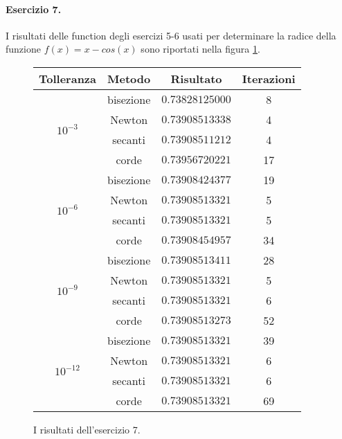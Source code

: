 \paragraph{Esercizio 7.} I risultati delle function degli esercizi 5-6 usati per determinare la radice della funzione $f(x) = x - cos(x)$ sono riportati nella figura \ref{fig:esercizio7}.

\begin{figure}
  \centering
  \begin{tabular}{ |c|c|c|c| }
    \hline
    Tolleranza & Metodo & Risultato & Iterazioni \\
    \hline\hline
    
    \multirow{4}{4em}{\[ 10^{-3} \]} & bisezione & $0.73828125000$ & 8 \\
    \cline{2-4}
    & Newton & $0.73908513338$ & 4 \\
    \cline{2-4}
    & secanti & $0.73908511212$ & 4 \\
    \cline{2-4}
    & corde & $0.73956720221$ & 17 \\
    \hline\hline
    
    \multirow{4}{4em}{\[ 10^{-6} \]} & bisezione & $0.73908424377$ & 19 \\
    \cline{2-4}
    & Newton & $0.73908513321$ & 5 \\
    \cline{2-4}
    & secanti & $0.73908513321$ & 5 \\
    \cline{2-4}
    & corde & $0.73908454957$ & 34 \\
    \hline\hline
    
    \multirow{4}{4em}{\[ 10^{-9} \]} & bisezione & $0.73908513411$ & 28 \\
    \cline{2-4}
    & Newton & $0.73908513321$ & 5 \\
    \cline{2-4}
    & secanti & $0.73908513321$ & 6 \\
    \cline{2-4}
    & corde & $0.73908513273$ & 52 \\
    \hline\hline
    
    \multirow{4}{4em}{\[ 10^{-12} \]} & bisezione & $0.73908513321$ & 39 \\
    \cline{2-4}
    & Newton & $0.73908513321$ & 6 \\
    \cline{2-4}
    & secanti & $0.73908513321$ & 6 \\
    \cline{2-4}
    & corde & $0.73908513321$ & 69 \\
    \hline
  \end{tabular}

  \caption{I risultati dell'esercizio 7.}
  \label{fig:esercizio7}
\end{figure}

